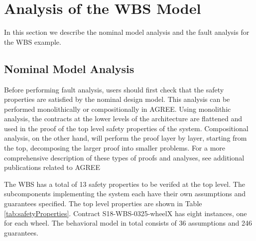 \section{Analysis of the WBS Model}
\label{sec:fault_analysis_2}
In this section we describe the nominal model analysis and the fault analysis for the WBS example.  

\subsection{Nominal Model Analysis}
Before performing fault analysis, users should first check that the safety properties are satisfied by the nominal design model. This analysis can be performed monolithically or compositionally in AGREE. Using monolithic analysis, the contracts at the lower levels of the architecture are flattened and used in the proof of the top level safety properties of the system. Compositional analysis, on the other hand, will perform the proof layer by layer, starting from the top, decomposing the larger proof into smaller problems. For a more comprehensive description of these types of proofs and analyses, see additional publications related to AGREE \cite{cofer2012compositional,QFCS15:backes} 

The WBS has a total of 13 safety properties to be verifed at the top level.  The subcomponents implementing the system each have their own assumptions and guarantees specified. The top level properties are shown in Table \ref{tab:safetyProperties}. Contract S18-WBS-0325-wheelX has eight instances, one for each wheel. The behavioral model in total consists of 36 assumptions and 246 guarantees.


